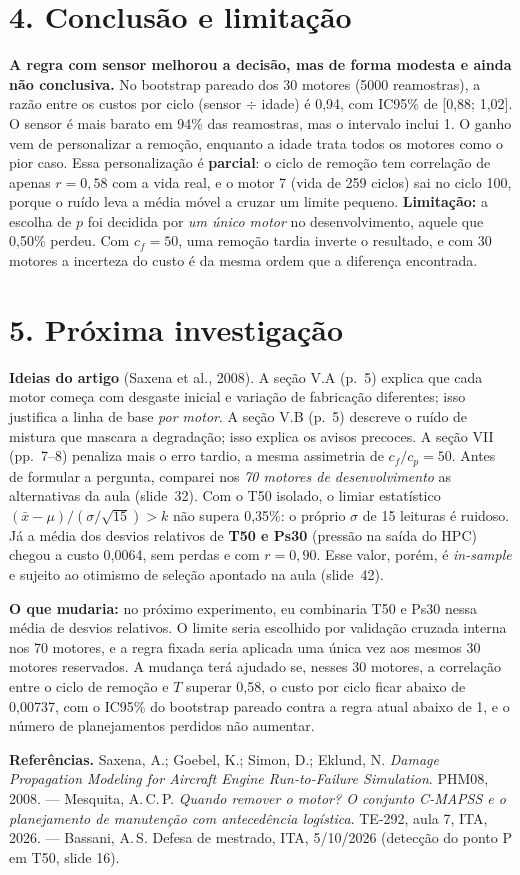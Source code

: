 \documentclass[12pt,a4paper]{article}
\begin{document}
\section*{4. Conclusão e limitação}
\textbf{A regra com sensor melhorou a decisão, mas de forma modesta e ainda não conclusiva.} No bootstrap pareado dos 30 motores
(5000 reamostras), a razão entre os custos por ciclo (sensor $\div$ idade) é 0,94, com IC95\% de [0,88; 1,02]. O sensor é mais barato
em 94\% das reamostras, mas o intervalo inclui 1. O ganho vem de personalizar a remoção, enquanto a idade trata todos os motores como
o pior caso. Essa personalização é \textbf{parcial}: o ciclo de remoção tem correlação de apenas $r=0{,}58$ com a vida real, e o motor
7 (vida de 259 ciclos) sai no ciclo 100, porque o ruído leva a média móvel a cruzar um limite pequeno. \textbf{Limitação:} a escolha
de $p$ foi decidida por \emph{um único motor} no desenvolvimento, aquele que 0,50\% perdeu. Com $c_f=50$, uma remoção tardia inverte o
resultado, e com 30 motores a incerteza do custo é da mesma ordem que a diferença encontrada.

\section*{5. Próxima investigação}
\textbf{Ideias do artigo} (Saxena et al., 2008). A seção V.A (p.~5) explica que cada motor começa com desgaste inicial e variação de
fabricação diferentes; isso justifica a linha de base \emph{por motor}. A seção V.B (p.~5) descreve o ruído de mistura que mascara a
degradação; isso explica os avisos precoces. A seção VII (pp.~7--8) penaliza mais o erro tardio, a mesma assimetria de $c_f/c_p=50$.
Antes de formular a pergunta, comparei nos \emph{70 motores de desenvolvimento} as alternativas da aula (slide~32). Com o T50
isolado, o limiar estatístico $(\bar x-\mu)/(\sigma/\sqrt{15})>k$ não supera 0,35\%: o próprio $\sigma$ de 15 leituras é ruidoso.
Já a média dos desvios relativos de \textbf{T50 e Ps30} (pressão na saída do HPC) chegou a custo 0,0064, sem perdas e com $r=0{,}90$.
Esse valor, porém, é \emph{in-sample} e sujeito ao otimismo de seleção apontado na aula (slide~42).

\textbf{O que mudaria:} no próximo experimento, eu combinaria T50 e Ps30 nessa média de desvios relativos. O limite seria escolhido
por validação cruzada interna nos 70 motores, e a regra fixada seria aplicada uma única vez aos mesmos 30 motores reservados. A
mudança terá ajudado se, nesses 30 motores, a correlação entre o ciclo de remoção e $T$ superar 0,58, o custo por ciclo ficar
abaixo de 0,00737, com o IC95\% do bootstrap pareado contra a regra atual abaixo de 1, e o número de planejamentos perdidos não
aumentar.

\vspace{2pt}\footnotesize\textbf{Referências.} Saxena, A.; Goebel, K.; Simon, D.; Eklund, N. \emph{Damage Propagation Modeling for
Aircraft Engine Run-to-Failure Simulation}. PHM08, 2008. --- Mesquita, A.\,C.\,P. \emph{Quando remover o motor? O conjunto C-MAPSS e o
planejamento de manutenção com antecedência logística}. TE-292, aula 7, ITA, 2026. --- Bassani, A.\,S. Defesa de mestrado, ITA,
5/10/2026 (detecção do ponto P em T50, slide 16).
\end{document}

